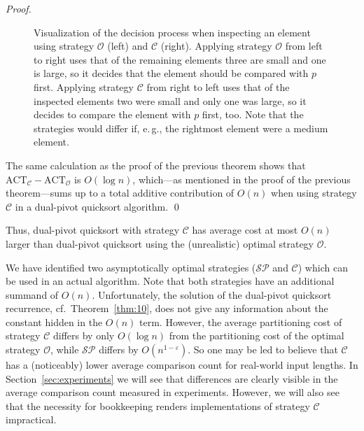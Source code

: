 \documentclass[prodmode,acmtalg]{acmsmall}
\begin{document}
\begin{proof}
\begin{figure}[t!]
{}
    \caption{Visualization of the decision process when inspecting an element using 
    strategy $\mathcal{O}$ (left) and $\mathcal{C}$ (right). Applying strategy $\mathcal{O}$
    from left to right uses that of the remaining elements three are small and
    one is large, so it decides that the element should be compared with $p$ first.
    Applying strategy $\mathcal{C}$
from right to left uses that of the inspected elements two were small and only one was large, 
so it decides to compare the element with $p$ first, too. Note that the strategies
would differ if, e.\,g., the rightmost element were a medium element.}
    \label{fig:strategy:difference}
    \end{figure}
The same calculation as the proof of the previous theorem shows that  
$\text{ACT}_\mathcal{C} - \text{ACT}_\mathcal{O}$ is $O(\log n)$,
which---as mentioned in the proof of the previous theorem---sums up to a
total additive contribution of $O(n)$ when using strategy $\mathcal{C}$ in a dual-pivot quicksort
algorithm. 
\qed
\end{proof}
Thus, dual-pivot quicksort with strategy $\mathcal{C}$ has
average cost at most $O(n)$ larger than dual-pivot quicksort using the
(unrealistic) optimal strategy $\mathcal{O}$.

We have identified two asymptotically optimal strategies ($\mathcal{SP}$ and $\mathcal{C}$) 
which can be used in an
actual algorithm. Note that both strategies have an additional
summand of $O(n)$. Unfortunately, the solution of the dual-pivot quicksort 
recurrence, cf.~Theorem~\ref{thm:10}, 
does not  give any information about the constant hidden in the $O(n)$ term.
However, the average partitioning cost of strategy $\mathcal{C}$ differs 
by only
$O(\log n)$ from the partitioning cost of the optimal strategy $\mathcal{O}$, while $\mathcal{SP}$ 
differs by $O(n^{1-\varepsilon})$. So one may be led to believe that $\mathcal{C}$ has a (noticeably)
lower average comparison count for real-world input lengths. 
In
Section~\ref{sec:experiments} we will see that differences are clearly
visible in the average comparison count measured in experiments. However, we
will also see that the necessity for  bookkeeping renders implementations of
strategy $\mathcal{C}$ impractical.
\end{document}
